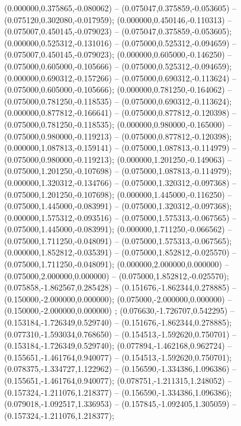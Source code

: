  (0.000000,0.375865,-0.080062) -- (0.075047,0.375859,-0.053605) -- (0.075120,0.302080,-0.017959);
 (0.000000,0.450146,-0.110313) -- (0.075007,0.450145,-0.079023) -- (0.075047,0.375859,-0.053605);
 (0.000000,0.525312,-0.131016) -- (0.075000,0.525312,-0.094659) -- (0.075007,0.450145,-0.079023);
 (0.000000,0.605000,-0.146250) -- (0.075000,0.605000,-0.105666) -- (0.075000,0.525312,-0.094659);
 (0.000000,0.690312,-0.157266) -- (0.075000,0.690312,-0.113624) -- (0.075000,0.605000,-0.105666);
 (0.000000,0.781250,-0.164062) -- (0.075000,0.781250,-0.118535) -- (0.075000,0.690312,-0.113624);
 (0.000000,0.877812,-0.166641) -- (0.075000,0.877812,-0.120398) -- (0.075000,0.781250,-0.118535);
 (0.000000,0.980000,-0.165000) -- (0.075000,0.980000,-0.119213) -- (0.075000,0.877812,-0.120398);
 (0.000000,1.087813,-0.159141) -- (0.075000,1.087813,-0.114979) -- (0.075000,0.980000,-0.119213);
 (0.000000,1.201250,-0.149063) -- (0.075000,1.201250,-0.107698) -- (0.075000,1.087813,-0.114979);
 (0.000000,1.320312,-0.134766) -- (0.075000,1.320312,-0.097368) -- (0.075000,1.201250,-0.107698);
 (0.000000,1.445000,-0.116250) -- (0.075000,1.445000,-0.083991) -- (0.075000,1.320312,-0.097368);
 (0.000000,1.575312,-0.093516) -- (0.075000,1.575313,-0.067565) -- (0.075000,1.445000,-0.083991);
 (0.000000,1.711250,-0.066562) -- (0.075000,1.711250,-0.048091) -- (0.075000,1.575313,-0.067565);
 (0.000000,1.852812,-0.035391) -- (0.075000,1.852812,-0.025570) -- (0.075000,1.711250,-0.048091);
 (0.000000,2.000000,0.000000) -- (0.075000,2.000000,0.000000) -- (0.075000,1.852812,-0.025570);
 (0.075858,-1.862567,0.285428) -- (0.151676,-1.862344,0.278885) -- (0.150000,-2.000000,0.000000);
 (0.075000,-2.000000,0.000000) -- (0.150000,-2.000000,0.000000) ;
 (0.076630,-1.726707,0.542295) -- (0.153184,-1.726349,0.529740) -- (0.151676,-1.862344,0.278885);
 (0.077310,-1.593034,0.768650) -- (0.154513,-1.592620,0.750701) -- (0.153184,-1.726349,0.529740);
 (0.077894,-1.462168,0.962724) -- (0.155651,-1.461764,0.940077) -- (0.154513,-1.592620,0.750701);
 (0.078375,-1.334727,1.122962) -- (0.156590,-1.334386,1.096386) -- (0.155651,-1.461764,0.940077);
 (0.078751,-1.211315,1.248052) -- (0.157324,-1.211076,1.218377) -- (0.156590,-1.334386,1.096386);
 (0.079018,-1.092517,1.336953) -- (0.157845,-1.092405,1.305059) -- (0.157324,-1.211076,1.218377);
